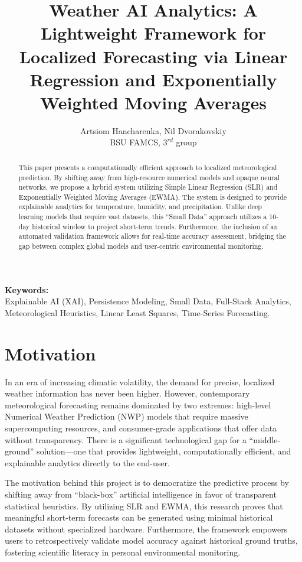\documentclass[14pt]{extarticle}
\title{Weather AI Analytics: A Lightweight Framework for Localized Forecasting via Linear Regression and Exponentially Weighted Moving Averages}
\author{Artsiom Hancharenka, Nil Dvorakovskiy \\ \small BSU FAMCS, $3^{rd}$ group}
\date{}
\begin{document}
\maketitle

\begin{abstract}
This paper presents a computationally efficient approach to localized meteorological prediction. By shifting away from high-resource numerical models and opaque neural networks, we propose a hybrid system utilizing Simple Linear Regression (SLR) and Exponentially Weighted Moving Averages (EWMA). The system is designed to provide explainable analytics for temperature, humidity, and precipitation. Unlike deep learning models that require vast datasets, this ``Small Data'' approach utilizes a 10-day historical window to project short-term trends. Furthermore, the inclusion of an automated validation framework allows for real-time accuracy assessment, bridging the gap between complex global models and user-centric environmental monitoring.
\end{abstract}

\textbf{Keywords:} \\
Explainable AI (XAI), Persistence Modeling, Small Data, Full-Stack Analytics, Meteorological Heuristics, Linear Least Squares, Time-Series Forecasting.

\section{Motivation}
In an era of increasing climatic volatility, the demand for precise, localized weather information has never been higher. However, contemporary meteorological forecasting remains dominated by two extremes: high-level Numerical Weather Prediction (NWP) models that require massive supercomputing resources, and consumer-grade applications that offer data without transparency. There is a significant technological gap for a ``middle-ground'' solution—one that provides lightweight, computationally efficient, and explainable analytics directly to the end-user.

The motivation behind this project is to democratize the predictive process by shifting away from ``black-box'' artificial intelligence in favor of transparent statistical heuristics. By utilizing SLR and EWMA, this research proves that meaningful short-term forecasts can be generated using minimal historical datasets without specialized hardware. Furthermore, the framework empowers users to retrospectively validate model accuracy against historical ground truths, fostering scientific literacy in personal environmental monitoring.
\end{document}
